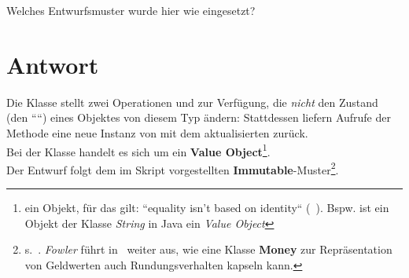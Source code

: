 Welches Entwurfsmuster wurde hier wie eingesetzt?

\section*{Antwort}

Die Klasse  stellt zwei Operationen  und  zur Verfügung, die \textit{nicht} den Zustand (den ````) eines Objektes von diesem Typ ändern: Stattdessen liefern Aufrufe der Methode eine neue Instanz von  mit dem aktualisierten  zurück.\\

\noindent
Bei der Klasse  handelt es sich um ein \textbf{Value Object}\footnote{
    ein Objekt, für das gilt: ``equality isn't based on identity`` (~\cite[486]{Fow03b}). Bspw. ist ein Objekt der Klasse \textit{String} in Java ein \textit{Value Object}
}.\\
Der Entwurf folgt dem im Skript vorgestellten \textbf{Immutable}-Muster\footnote{
    s.~\cite[58]{Wed09b}. \textit{Fowler} führt in~\cite[488]{Fow03b} weiter aus, wie eine Klasse \textbf{Money} zur Repräsentation von Geldwerten auch Rundungsverhalten kapseln kann.
}.\\
